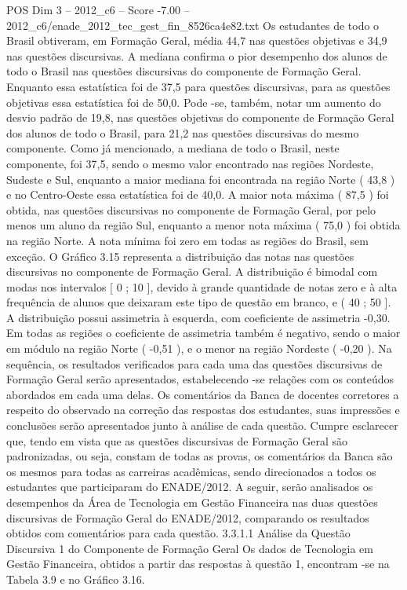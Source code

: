 \begin{textsample}{POS Dim 3 – 2012\_c6 – Score -7.00 – 2012\_c6/enade\_2012\_tec\_gest\_fin\_8526ca4e82.txt}
Os estudantes de todo o Brasil obtiveram, em Formação Geral, média 44,7 nas questões objetivas e 34,9 nas questões discursivas.
A mediana confirma o pior desempenho dos alunos de todo o Brasil nas questões discursivas do componente de Formação Geral.
Enquanto essa estatística foi de 37,5 para questões discursivas, para as questões objetivas essa estatística foi de 50,0.
Pode -se, também, notar um aumento do desvio padrão de 19,8, nas questões objetivas do componente de Formação Geral dos alunos de todo o Brasil, para 21,2 nas questões discursivas do mesmo componente.
Como já mencionado, a mediana de todo o Brasil, neste componente, foi 37,5, sendo o mesmo valor encontrado nas regiões Nordeste, Sudeste e Sul, enquanto a maior mediana foi encontrada na região Norte ( 43,8 ) e no Centro-Oeste essa estatística foi de 40,0.
A maior nota máxima ( 87,5 ) foi obtida, nas questões discursivas no componente de Formação Geral, por pelo menos um aluno da região Sul, enquanto a menor nota máxima ( 75,0 ) foi obtida na região Norte.
A nota mínima foi zero em todas as regiões do Brasil, sem exceção.
O Gráfico 3.15 representa a distribuição das notas nas questões discursivas no componente de Formação Geral.
A distribuição é bimodal com modas nos intervalos [ 0 ; 10 ], devido à grande quantidade de notas zero e à alta frequência de alunos que deixaram este tipo de questão em branco, e ( 40 ; 50 ].
A distribuição possui assimetria à esquerda, com coeficiente de assimetria -0,30.
Em todas as regiões o coeficiente de assimetria também é negativo, sendo o maior em módulo na região Norte ( -0,51 ), e o menor na região Nordeste ( -0,20 ).
Na sequência, os resultados verificados para cada uma das questões discursivas de Formação Geral serão apresentados, estabelecendo -se relações com os conteúdos abordados em cada uma delas.
Os comentários da Banca de docentes corretores a respeito do observado na correção das respostas dos estudantes, suas impressões e conclusões serão apresentados junto à análise de cada questão.
Cumpre esclarecer que, tendo em vista que as questões discursivas de Formação Geral são padronizadas, ou seja, constam de todas as provas, os comentários da Banca são os mesmos para todas as carreiras acadêmicas, sendo direcionados a todos os estudantes que participaram do ENADE/2012.
A seguir, serão analisados os desempenhos da Área de Tecnologia em Gestão Financeira nas duas questões discursivas de Formação Geral do ENADE/2012, comparando os resultados obtidos com comentários para cada questão. 3.3.1.1 Análise da Questão Discursiva 1 do Componente de Formação Geral Os dados de Tecnologia em Gestão Financeira, obtidos a partir das respostas à questão 1, encontram -se na Tabela 3.9 e no Gráfico 3.16.

\end{textsample}
